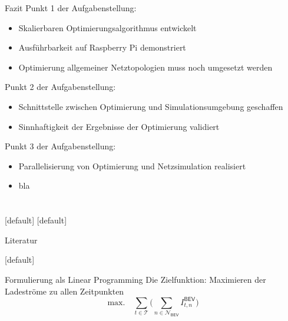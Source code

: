 \documentclass[aspectratio=169]{beamer}
\makeatletter
\newenvironment{withoutheadline}{
        \setbeamertemplate{headline}[default]
        \def\beamer@entrycode{\vspace*{-\headheight}}
    }{}
\makeatother
\begin{document}
\begin{frame}{Fazit}
	Punkt 1 der Aufgabenstellung:
	\begin{itemize}
		\item Skalierbaren Optimierungsalgorithmus entwickelt
		\item Ausführbarkeit auf Raspberry Pi demonstriert
		\item Optimierung allgemeiner Netztopologien muss noch umgesetzt werden
	\end{itemize}\vspace{.5cm}
	Punkt 2 der Aufgabenstellung:
	\begin{itemize}
		\item Schnittstelle zwischen Optimierung und Simulationsumgebung
		geschaffen
		\item Sinnhaftigkeit der Ergebnisse der Optimierung validiert
	\end{itemize}\vspace{.5cm}
	Punkt 3 der Aufgabenstellung:
	\begin{itemize}
		\item Parallelisierung von Optimierung und Netzsimulation realisiert
		\item bla
	\end{itemize}
\end{frame}


\section{}
[default]
\begin{withoutheadline}
\begin{frame}[noframenumbering]{Literatur}
	\printbibliography[heading=none]
\end{frame}
\end{withoutheadline}

\begin{withoutheadline}
\begin{frame}[noframenumbering]{Formulierung als Linear Programming}
	Die Zielfunktion: Maximieren der Ladeströme zu allen Zeitpunkten
	\begin{equation*}
		\text{max.}\quad\sum_{t\in\mathcal{T}}\bigg(\sum_{n\in
		\mathcal{N_\mathsf{BEV}}}\!\!I^\mathsf{BEV}_{t,n}\bigg)
	\end{equation*}
\end{frame}
\end{withoutheadline}
\end{document}
